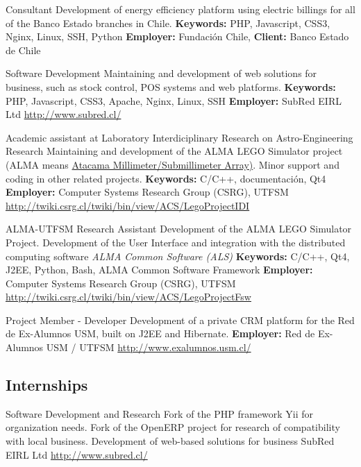 \documentclass[11pt,a4paper,sans]{moderncv}
\begin{document}
        {Consultant}
        {Development of energy efficiency platform using electric billings for all of the Banco Estado branches in Chile.}
        {\textbf{Keywords:} PHP, Javascript, CSS3, Nginx, Linux, SSH, Python}
        {\textbf{Employer:} Fundación Chile, \textbf{Client:} Banco Estado de Chile}
        {}

        {Software Development}
        {Maintaining and development of web solutions for business, such as stock control, POS systems and web platforms.}
        {\textbf{Keywords:} PHP, Javascript, CSS3, Apache, Nginx, Linux, SSH}
        {\textbf{Employer:} SubRed EIRL Ltd}
        {\url{http://www.subred.cl/}}

        {Academic assistant at Laboratory Interdiciplinary Research on Astro-Engineering Research}
        {Maintaining and development of the ALMA LEGO Simulator project (ALMA means \href{http://www.alma.cl/}{Atacama Millimeter/Submillimeter Array)}. Minor support and coding in other related projects.}
        {\textbf{Keywords:} C/C++, documentación, Qt4}
        {\textbf{Employer:} Computer Systems Research Group (CSRG), UTFSM}
        {\url{http://twiki.csrg.cl/twiki/bin/view/ACS/LegoProjectIDI}}

        {ALMA-UTFSM Research Assistant}
        {Development of the ALMA LEGO Simulator Project. Development of the User Interface and integration with the distributed computing software \emph{ALMA Common Software (ALS)}}
        {\textbf{Keywords:} C/C++, Qt4, J2EE, Python, Bash, ALMA Common Software Framework}
        {\textbf{Employer:} Computer Systems Research Group (CSRG), UTFSM}
        {\url{http://twiki.csrg.cl/twiki/bin/view/ACS/LegoProjectFsw}}

        {Project Member - Developer}
        {Development of a private CRM platform for the Red de Ex-Alumnos USM, built on J2EE and Hibernate.}
        {\textbf{Employer:} Red de Ex-Alumnos USM / UTFSM}
        {}
        {\url{http://www.exalumnos.usm.cl/}}

\subsection{Internships}


        {Software Development and Research}
        {Fork of the PHP framework Yii for organization needs. Fork of the OpenERP project for research of compatibility with local business. Development of web-based solutions for business}
        {SubRed EIRL Ltd}
        {}
        {\url{http://www.subred.cl/}}
\end{document}
